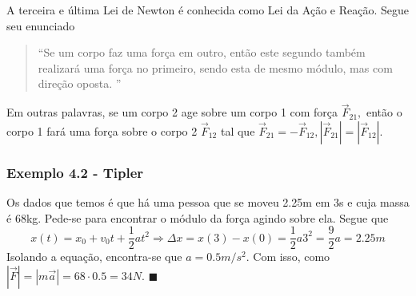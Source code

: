 \documentclass{article}
\renewcommand\qedsymbol{$\blacksquare$}
\begin{document}
  A terceira e \'ultima Lei de Newton \'e conhecida como Lei da A\c c\~ao e Rea\c c\~ao. Segue seu enunciado
 \begin{quote}
   ``Se um corpo faz uma for\c ca em outro, ent\~ao este segundo tamb\'em realizar\'a uma for\c ca no primeiro, sendo esta de
   mesmo m\'odulo, mas com dire\c c\~ao oposta. ''
 \end{quote}
  Em outras palavras, se um corpo 2 age sobre um corpo 1 com for\c ca $\vec{F}_{21},$ ent\~ao o corpo 1 far\'a uma for\c ca sobre
  o corpo 2 $\vec{F}_{12}$ tal que $\vec{F}_{21} = -\vec{F}_{12}, |\vec{F}_{21}| = |\vec{F}_{12}|$.

  \subsubsection{Exemplo 4.2 - Tipler}
  Os dados que temos \'e que h\'a uma pessoa que se moveu 2.25m em 3s e cuja massa \'e 68kg. Pede-se para encontrar o m\'odulo da for\c ca
agindo sobre ela. Segue que 
  $$
    x(t) = x_{0} + v_{0}t + \frac{1}{2}at^{2} \Rightarrow \Delta x = x(3) - x(0) = \frac{1}{2}a3^{2} = \frac{9}{2}a = 2.25m
  $$
  Isolando a equa\c c\~ao, encontra-se que $a = 0.5m/s^{2}.$ Com isso, como $|\vec{F}| = |m \vec{a}| = 68 \cdot 0.5 = 34N$. \qedsymbol
\end{document}
